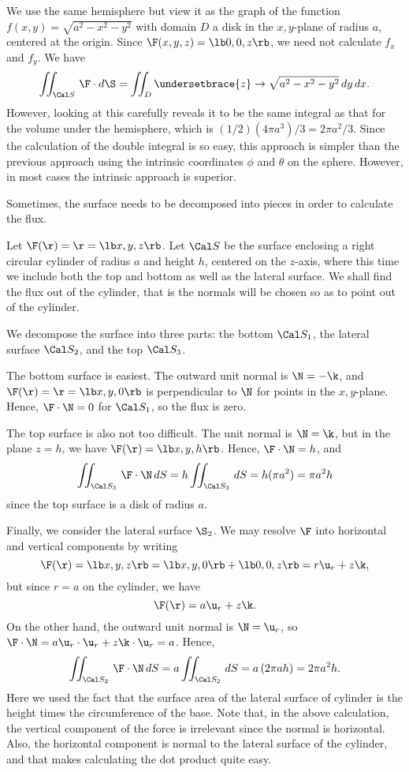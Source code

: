   We use the same
hemisphere but view it as the graph of the function
$f(x,y) = \sqrt{a^2 - x^2 - y^2}$ with 
   domain $D$ 
a disk in the $x,y$-plane of radius $a$, centered at the origin.
  Since $\F(x,y,z) = \lb 0,0, z\rb$,
we need not calculate $f_x$ and $f_y$.  We have 
$$
\iint_{\Cal S}\,\F\cdot d\S = \iint_D
\undersetbrace{z}\to{\sqrt{a^2 - x^2 - y^2}}\,dy\,dx.
$$
However, looking at this carefully reveals it to be the same
integral as that for the volume under the hemisphere, which is
$(1/2)(4\pi a^3)/3 = 2\pi a^2/3$.  
Since the calculation of the double integral
is so easy, this approach is simpler than the previous
approach using the intrinsic coordinates $\phi$ and
$\theta$ on the sphere.  However, in most cases the intrinsic approach
is superior.
\endexample

Sometimes, the surface needs to be decomposed into pieces in order
to calculate the flux.

\nextex
{}  Let $\F(\r) = \r = \lb x, y, z\rb$.  Let
$\Cal S$ be the surface enclosing a right circular cylinder
of radius $a$ and height $h$, centered on the $z$-axis, where this
time we include both the top and bottom as well as the lateral
surface.  We shall find the flux out of the cylinder, that is the
normals will be chosen so as to point out of the cylinder.

We decompose the surface into three parts: the bottom $\Cal S_1$,
the lateral surface $\Cal S_2$, and the top $\Cal S_3$.

The bottom surface is easiest.  The outward unit
normal is $\N = -\k$, and $\F(\r) = \r = \lb x, y, 0 \rb$
is perpendicular to $\N$ for points in the $x,y$-plane.
Hence, $\F\cdot\N = 0$ for $\Cal S_1$, so the flux is
zero.   

The top surface is also not too difficult.  The unit normal
is $\N = \k$, but in the plane $z = h$, we have
$\F(\r) = \lb x, y, h \rb$.  Hence,  $\F\cdot\N = h$,
and
$$
\iint_{\Cal S_3}\,\F\cdot\N\,dS = h \iint_{\Cal S_3}\,dS = h (\pi a^2)
 = \pi a^2h
$$
since the top surface is a disk of radius $a$.

Finally, we consider the lateral surface $\S_2$.  We may 
resolve $\F$ into horizontal and vertical components
by writing
$$
  \F(\r) = \lb x, y, z \rb = \lb x,y,0\rb + \lb 0,0,z \rb
                   = r\u_r + z\k,
$$
but since $r = a$ on the cylinder, we have
$$
\F(\r) = a\u_r + z\k.
$$
On the other hand, the outward unit normal is $\N = \u_r$, so
$\F\cdot\N = a\u_r\cdot\u_r + z\k\cdot\u_r = a$.  Hence,
$$
\iint_{\Cal S_2}\,\F\cdot\N\,dS = a\iint_{\Cal S_2}\,dS
= a\,(2\pi a h) = 2\pi a^2 h.
$$
Here we used the fact that the surface area of the lateral
surface of cylinder is the height times the circumference of
the base. 
Note that, in the above calculation,  the vertical
component of the force is irrelevant since the normal is horizontal.
Also, the horizontal component is normal to the
lateral surface of the cylinder, and that makes calculating the
dot product quite easy.
 
